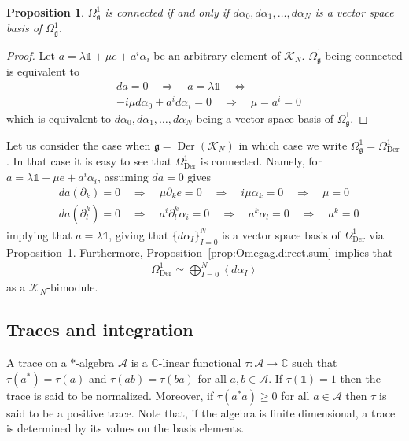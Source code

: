 \documentclass{amsart}
\newcommand{\complex}{\mathbb{C}}
\newcommand{\angles}[1]{\left\langle #1 \right\rangle}
\newcommand{\spacearound}[1]{\quad#1\quad}
\newcommand{\equivalent}{\spacearound{\Leftrightarrow}}
\renewcommand{\implies}{\spacearound{\Rightarrow}}
\newtheorem{proposition}[theorem]{Proposition}
\theoremstyle{definition}
\theoremstyle{remark}
\numberwithin{equation}{section}
\newcommand{\A}{\mathcal{A}}
\newcommand{\K}{\mathcal{K}}
\renewcommand{\mid}{\mathds{1}}
\newcommand{\KN}{\K_N}
\renewcommand{\d}{\partial}
\newcommand{\Der}{\operatorname{Der}}
\newcommand{\g}{\mathfrak{g}}
\newcommand{\Omegaoneg}{\Omega^1_{\g}}
\begin{document}
\begin{proposition}\label{prop:connected.vspace.basis}
  $\Omegaoneg$ is connected if and only if $d\alpha_0,d\alpha_1,\ldots,d\alpha_N$ is
  a vector space basis of $\Omegaoneg$.
\end{proposition}

\begin{proof}
  Let $a=\lambda\mid + \mu e + a^i\alpha_i$ be an arbitrary element of
  $\KN$. $\Omegaoneg$ being connected is equivalent to
  \begin{align*}
    &da = 0\implies a=\lambda\mid \equivalent\\
    &-i\mu d\alpha_0 + a^id\alpha_i = 0 \implies \mu=a^i=0
  \end{align*}
  which is equivalent to
  $d\alpha_0,d\alpha_1,\ldots,d\alpha_N$ being a vector space basis of
  $\Omegaoneg$.
\end{proof}

\noindent
Let us consider the case when $\g=\Der(\KN)$ in which case we write
$\Omegaoneg=\Omega^1_{\Der}$. In that case it is easy to see
that $\Omega_{\Der}^1$ is connected. Namely, for
$a=\lambda\mid + \mu e + a^i\alpha_i$, assuming $da=0$ gives
\begin{align*}
  &da(\d_k)=0 \implies \mu\d_ke = 0\implies i\mu\alpha_k = 0\implies \mu = 0\\
  &da(\d^k_l) = 0\implies a^i\d^k_l\alpha_i = 0\implies a^k\alpha_l = 0\implies a^k=0
\end{align*}
implying that $a=\lambda\mid$, giving that $\{d\alpha_I\}_{I=0}^N$ is
a vector space basis of $\Omega_{\Der}^1$ via
Proposition~\ref{prop:connected.vspace.basis}. Furthermore,
Proposition~\ref{prop:Omegag.direct.sum} implies that
\begin{align*}
  \Omega^1_{\Der} \simeq \bigoplus_{I=0}^N\angles{d\alpha_I}
\end{align*}
as a $\KN$-bimodule. 

\subsection{Traces and integration}

A trace on a $\ast$-algebra $\A$ is a $\complex$-linear functional
$\tau:\A\to\complex$ such that $\tau(a^\ast)=\overline{\tau(a)}$ and
$\tau(ab)=\tau(ba)$ for all $a,b\in\A$. If $\tau(\mid)=1$ then the
trace is said to be normalized. Moreover, if $\tau(a^\ast a)\geq 0$
for all $a\in\A$ then $\tau$ is said to be a positive trace. Note
that, if the algebra is finite dimensional, a trace is determined by
its values on the basis elements.
\end{document}
